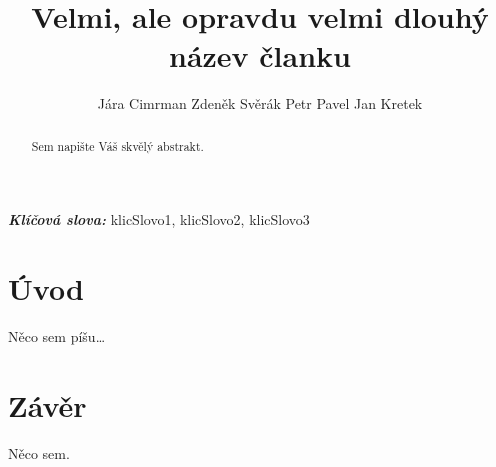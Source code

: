 \documentclass{cygclanek}
\begin{document}
\title{Velmi, ale opravdu velmi dlouhý název članku}

\author{Jára Cimrman Zdeněk Svěrák Petr Pavel Jan Kretek}
\newcommand{\inst}{
	\item \label{vut} VUTBR
	\item \label{ujv} UJVas
	\item \label{ujf} UJF CAS
	\item \label{kkk} KKK
}

\providecommand{\keywords}[1]{\textbf{\textit{Klíčová slova:}} #1}
\newcommand{\email}{cimrman\at vut.cz}

\maketitle
\begin{abstract}
	Sem napište Váš skvělý abstrakt.
\end{abstract}

\keywords{klicSlovo1, klicSlovo2, klicSlovo3}

\section{Úvod}
Něco sem píšu\dots



\section{Závěr}
Něco sem.


\printbibliography[title={Literatura}]
\end{document}
